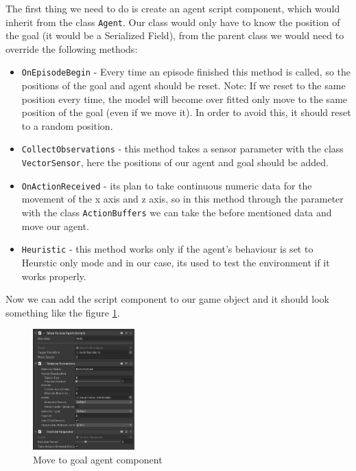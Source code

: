 \documentclass[a4paper,12pt,openright]{book}
\begin{document}
The first thing we need to do is create an agent script component, which would inherit from the class \texttt{Agent}. Our class would only have to know the position of the goal (it would be a Serialized Field), from the parent class we would need to override the following methods:
\begin{itemize}
    \item \texttt{OnEpisodeBegin} - Every time an episode finished this method is called, so the positions of the goal and agent should be reset. Note: If we reset to the same position every time, the model will become over fitted only move to the same position of the goal (even if we move it). In order to avoid this, it should reset to a random position.
    \item \texttt{CollectObservations} - this method takes a sensor parameter with the class \texttt{VectorSensor}, here the positions of our agent and goal should be added.
    \item \texttt{OnActionReceived} - its plan to take continuous numeric data for the movement of the x axis and z axis, so in this method through the parameter with the class \texttt{ActionBuffers} we can take the before mentioned data and move our agent.
    \item \texttt{Heuristic} - this method works only if the agent's behaviour is set to Heurstic only mode and in our case, its used to test the environment if it works properly.
\end{itemize}

Now we can add the script component to our game object and it should look something like the figure \ref{pic9}.
\begin{figure}[h]
\begin{center}
\includegraphics[width=0.35\textwidth]{Images/movetogoalcomponent.png}
\end{center}
\caption{Move to goal agent component}
\label{pic9}
\end{figure}
\end{document}
